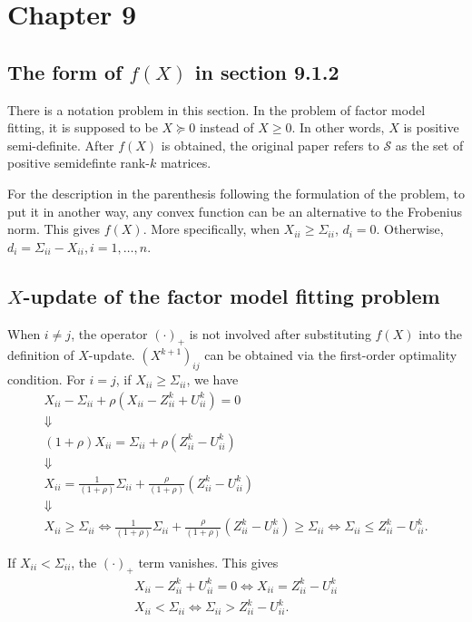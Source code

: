 \documentclass{article}
\theoremstyle{remark}
\begin{document}
\section{Chapter 9}
\subsection{The form of $f(X)$ in section 9.1.2}
There is a notation problem in this section. In the problem of factor model fitting, it is supposed to be $X\succeq 0$ instead of $X\ge 0$. In other words, $X$ is positive semi-definite. After $f(X)$ is obtained, the original paper refers to $\mathcal{S}$ as the set of positive semidefinte rank-$k$ matrices.

For the description in the parenthesis following the formulation of the problem, to put it in another way, any convex function can be an alternative to the Frobenius norm. This gives $f(X)$. More specifically, when $X_{ii}\ge \Sigma_{ii}$, $d_i=0$. Otherwise, $d_i=\Sigma_{ii}-X_{ii}, i=1,\ldots,n$.

\subsection{$X$-update of the factor model fitting problem}
When $i\neq j$, the operator $(\cdot)_+$ is not involved after substituting $f(X)$ into the definition of $X$-update. $(X^{k+1})_{ij}$ can be obtained via the first-order optimality condition. For $i=j$, if $X_{ii}\ge \Sigma_{ii}$, we have
\begin{gather*}
X_{ii}-\Sigma_{ii}+\rho (X_{ii}-Z^{k}_{ii}+U^{k}_{ii})=0 \\
\Downarrow\\
(1+\rho)X_{ii}=\Sigma_{ii}+\rho(Z^{k}_{ii}-U^{k}_{ii})\\
\Downarrow\\
X_{ii}=\frac{1}{(1+\rho)}\Sigma_{ii}+\frac{\rho}{(1+\rho)}(Z^{k}_{ii}-U^{k}_{ii})\\
\Downarrow\\
X_{ii}\ge \Sigma_{ii} \Longleftrightarrow \frac{1}{(1+\rho)}\Sigma_{ii}+\frac{\rho}{(1+\rho)}(Z^{k}_{ii}-U^{k}_{ii})\ge \Sigma_{ii}\Longleftrightarrow \Sigma_{ii}\le Z^{k}_{ii}-U^{k}_{ii}.
\end{gather*}

If $X_{ii}< \Sigma_{ii}$, the $(\cdot)_+$ term vanishes. This gives 
\begin{gather*}
X_{ii}-Z^{k}_{ii}+U^{k}_{ii}=0 \Longleftrightarrow X_{ii}=Z^{k}_{ii}-U^{k}_{ii}\\
X_{ii}< \Sigma_{ii} \Longleftrightarrow \Sigma_{ii} > Z^{k}_{ii}-U^{k}_{ii}.
\end{gather*}
\end{document}
